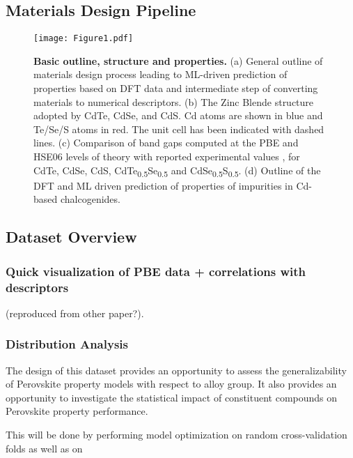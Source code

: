 \documentclass[aip, jmp, amsmath, amssymb, reprint]{revtex4-2}
\begin{document}
\subsection*{Materials Design Pipeline}
\label{sec:orgbba048d}
\begin{figure}[htbp]
\centering
\texttt{[image: Figure1.pdf]}
\caption{\label{fig:outline} \textbf{Basic outline, structure and properties.} (a) General outline of materials design process leading to ML-driven prediction of properties based on DFT data and intermediate step of converting materials to numerical descriptors. (b) The Zinc Blende structure adopted by CdTe, CdSe, and CdS. Cd atoms are shown in blue and Te/Se/S atoms in red. The unit cell has been indicated with dashed lines. (c) Comparison of band gaps computed at the PBE and HSE06 levels of theory with reported experimental values \cite{kim-2014-cdses-nanow,swanson-2017-co-sublim}, for CdTe, CdSe, CdS, CdTe\textsubscript{0.5}Se\textsubscript{0.5} and CdSe\textsubscript{0.5}S\textsubscript{0.5}. (d) Outline of the DFT and ML driven prediction of properties of impurities in Cd-based chalcogenides.}
\end{figure}
\subsection*{Dataset Overview}
\label{sec:org0ef901b}
\subsubsection*{Quick visualization of PBE data + correlations with descriptors}
\label{sec:org53abaa5}
(reproduced from other paper?).\\
\subsubsection*{Distribution Analysis}
\label{sec:orged16ac5}
The design of this dataset provides an opportunity to assess the
generalizability of Perovskite property models with respect to alloy
group. It also provides an opportunity to investigate the statistical
impact of constituent compounds on Perovskite property performance.

This will be done by performing model optimization on random
cross-validation folds as well as on 
\end{document}

